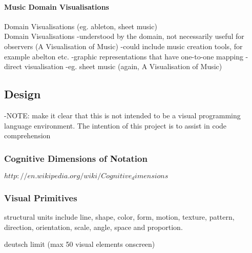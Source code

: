\paragraph{Music Domain Visualisations}
Domain Visualisations (eg. ableton, sheet music)\\

Domain Visualisations
-understood by the domain, not necessarily useful for observers (A Visualisation of Music)
-could include music creation tools, for example abelton etc.
-graphic representations that have one-to-one mapping
-direct visualisation
-eg. sheet music (again, A Visualisation of Music)




\subsection{Design}

-NOTE: make it clear that this is not intended to be a visual programming language environment. The intention of this project is to assist in code comprehension 

\subsubsection{Cognitive Dimensions of Notation}
$http://en.wikipedia.org/wiki/Cognitive_dimensions$

\subsubsection{Visual Primitives}

structural units include line, shape, color, form, motion, texture, pattern, direction, orientation, scale, angle, space and proportion.

deutsch limit (max 50 visual elements onscreen)


